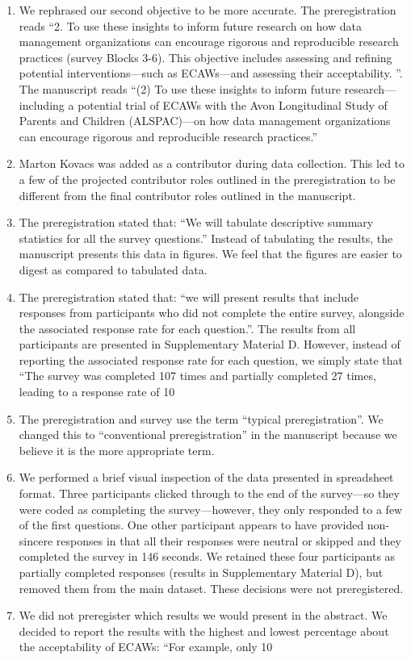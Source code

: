 \documentclass[
  man,floatsintext]{apa6}
\begin{document}
\begin{enumerate}
  \item We rephrased our second objective to be more accurate. The preregistration reads “2.    To use these insights to inform future research on how data management organizations can encourage rigorous and reproducible research practices (survey Blocks 3-6). This objective includes assessing and refining potential interventions—such as ECAWs—and assessing their acceptability. ”. The manuscript reads “(2) To use these insights to inform future research—including a potential trial of ECAWs with the Avon Longitudinal Study of Parents and Children (ALSPAC)—on how data management organizations can encourage rigorous and reproducible research practices.”
  \item Marton Kovacs was added as a contributor during data collection. This led to a few of the projected contributor roles outlined in the preregistration to be different from the final contributor roles outlined in the manuscript.
  \item The preregistration stated that: “We will tabulate descriptive summary statistics for all the survey questions.” Instead of tabulating the results, the manuscript presents this data in figures. We feel that the figures are easier to digest as compared to tabulated data.
  \item The preregistration stated that: “we   will   present   results   that   include   responses   from participants who did not complete the entire survey, alongside the associated response rate for each question.”. The results from all participants are presented in Supplementary Material D. However, instead of reporting the associated response rate for each question, we simply state that “The survey was completed 107 times and partially completed 27 times, leading to a response rate of 10%
  \item The preregistration and survey use the term “typical preregistration”. We changed this to “conventional preregistration” in the manuscript because we believe it is the more appropriate term.
  \item We performed a brief visual inspection of the data presented in spreadsheet format. Three participants clicked through to the end of the survey—so they were coded as completing the survey—however, they only responded to a few of the first questions. One other participant appears to have provided non-sincere responses in that all their responses were neutral or skipped and they completed the survey in 146 seconds. We retained these four participants as partially completed responses (results in Supplementary Material D), but removed them from the main dataset. These decisions were not preregistered.
  \item We did not preregister which results we would present in the abstract. We decided to report the results with the highest and lowest percentage about the acceptability of ECAWs: “For example, only 10%
\end{enumerate}
\end{document}
